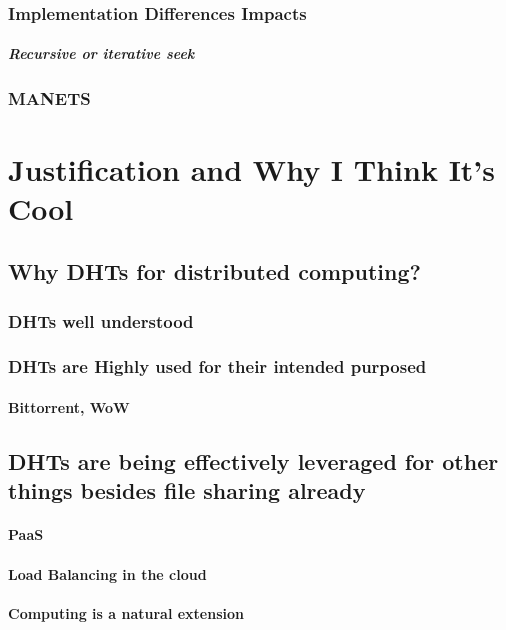 \documentclass[10pt,letterpaper]{report}
\begin{document}
\subsection{Implementation Differences Impacts}
\paragraph{Recursive or iterative seek}


\subsection{MANETS}
\chapter{Justification and Why I Think It's Cool}

\section{Why DHTs for distributed computing?}
\subsection{DHTs well understood}
\subsection{DHTs are Highly used for their intended purposed}
\subsubsection{Bittorrent, WoW}
\section{DHTs are being effectively leveraged for other things besides file sharing already}

\subsubsection{PaaS}
\subsubsection{Load Balancing in the cloud}
\subsubsection{Computing is a natural extension}
\end{document}
